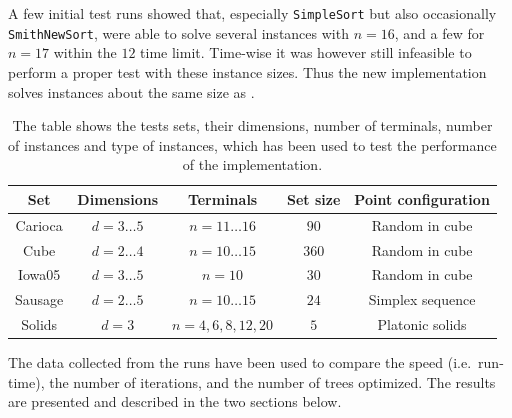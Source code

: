 A few initial test runs showed that, especially \texttt{SimpleSort} but also
occasionally \texttt{SmithNewSort}, were able to solve several instances with
$n=16$, and a few for $n=17$ within the $12$ time limit. Time-wise it was
however still infeasible to perform a proper test with these instance sizes.
Thus the new implementation solves instances about the same size as
\textcite{fonseca2014}.
%
\begin{table}[htbp]
  \centering
  \begin{tabular}{ccccc}
    \toprule
    Set     & Dimensions       & Terminals             & Set size & Point configuration \\
    \midrule
    Carioca & $d = 3 \ldots 5$ & $n = 11 \ldots 16$    & $90$     & Random in cube      \\
    Cube    & $d = 2 \ldots 4$ & $n = 10 \ldots 15$    & $360$    & Random in cube      \\
    Iowa05  & $d = 3 \ldots 5$ & $n = 10$              & $30$     & Random in cube      \\
    Sausage & $d = 2 \ldots 5$ & $n = 10 \ldots 15$    & $24$     & Simplex sequence    \\
    Solids  & $d = 3$          & $n = 4, 6, 8, 12, 20$ & $5$      & Platonic solids     \\
    \bottomrule
  \end{tabular}
  \caption[Test sets used to test performance]{The table shows the tests sets,
    their dimensions, number of terminals, number of instances and type of instances,
    which has been used to test the performance of the implementation.\label{tab:test-sets}}
\end{table}
%
%
The data collected from the runs have been used to compare the speed (i.e.\
run-time), the number of iterations, and the number of trees optimized. The
results are presented and described in the two sections below.
%
